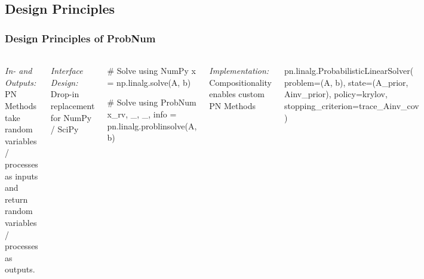 \documentclass[10pt,usepdftitle=false,aspectratio=169]{beamer}
\begin{document}
\subsection{Design Principles}

\begin{frame}[fragile]\frametitle{Design Principles of ProbNum}
	\framesubtitle{}

	\begin{columns}[totalwidth=\textwidth]

		\emph{In- and Outputs:} PN Methods take random variables / processes as inputs and return random
		variables / processes as outputs.
		\vspace{2ex}

		\emph{Interface Design:} Drop-in replacement for NumPy / SciPy

		\begin{python}
			# Solve using NumPy
			x = np.linalg.solve(A, b)

			# Solve using ProbNum
			x_rv, _, _, info = pn.linalg.problinsolve(A, b)\end{python}
		\vspace{2ex}

		\emph{Implementation:} Compositionality enables custom PN Methods

		\begin{python}
			pn.linalg.ProbabilisticLinearSolver(
			problem=(A, b),
			state=(A_prior, Ainv_prior),
			policy=krylov,
			stopping_criterion=trace_Ainv_cov
			)\end{python}

		\centering
		\vspace{-3ex}
		\href{https://github.com/probabilistic-numerics/probnum/}{\includegraphics[scale=1]{figures/probnum_logo.png}}

	\end{columns}

\end{frame}
\end{document}
